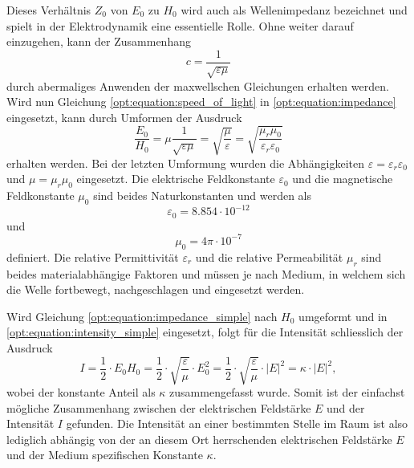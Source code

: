 Dieses Verhältnis $Z_0$ von $E_0$ zu $H_0$ wird auch als Wellenimpedanz bezeichnet und spielt in der Elektrodynamik eine essentielle Rolle.
Ohne weiter darauf einzugehen, kann der Zusammenhang
\begin{equation}
c
=
\frac{1}{\sqrt{\varepsilon\mu}}
\label{opt:equation:speed_of_light}
\end{equation}
durch abermaliges Anwenden der maxwellschen Gleichungen erhalten werden.
Wird nun Gleichung \eqref{opt:equation:speed_of_light} in \eqref{opt:equation:impedance} eingesetzt, kann durch Umformen der Ausdruck
\begin{equation}
\frac{E_0}{H_0}
=
\mu \frac{1}{\sqrt{\varepsilon\mu}}
=
\sqrt{\frac{\mu}{\varepsilon}}
=
\sqrt{\frac{\mu_r\mu_0}{\varepsilon_r\varepsilon_0}}
\label{opt:equation:impedance_simple}
\end{equation}
erhalten werden.
Bei der letzten Umformung wurden die Abhängigkeiten $\varepsilon = \varepsilon_r \varepsilon_0$ und $\mu = \mu_r \mu_0$ eingesetzt.
Die elektrische Feldkonstante $\varepsilon_0$ und die magnetische Feldkonstante $\mu_0$ sind beides Naturkonstanten und werden als
\begin{equation*}
\varepsilon_0
=
8.854 \cdot 10^{-12}
\end{equation*}
und
\begin{equation*}
\mu_0
=
4\pi \cdot 10^{-7}
\end{equation*}
definiert.
Die relative Permittivität $\varepsilon_r$ und die relative Permeabilität $\mu_r$ sind beides materialabhängige Faktoren und müssen je nach Medium, in welchem sich die Welle fortbewegt, nachgeschlagen und eingesetzt werden.

Wird Gleichung \eqref{opt:equation:impedance_simple} nach $H_0$ umgeformt und in \eqref{opt:equation:intensity_simple} eingesetzt, folgt für die Intensität schliesslich der Ausdruck
\begin{equation}
I
=
\frac{1}{2} \cdot E_0 H_0
=
\frac{1}{2} \cdot \sqrt{\frac{\varepsilon}{\mu}} \cdot E_0^2
=
\frac{1}{2} \cdot \sqrt{\frac{\varepsilon}{\mu}} \cdot |E|^2
=
\kappa \cdot |E|^2
,
\label{opt:equation:intensity}
\end{equation}
wobei der konstante Anteil als $\kappa$ zusammengefasst wurde.
Somit ist der einfachst mögliche Zusammenhang zwischen der elektrischen Feldstärke $E$ und der Intensität $I$ gefunden.
Die Intensität an einer bestimmten Stelle im Raum ist also lediglich abhängig von der an diesem Ort herrschenden elektrischen Feldstärke $E$ und der Medium spezifischen Konstante $\kappa$.

